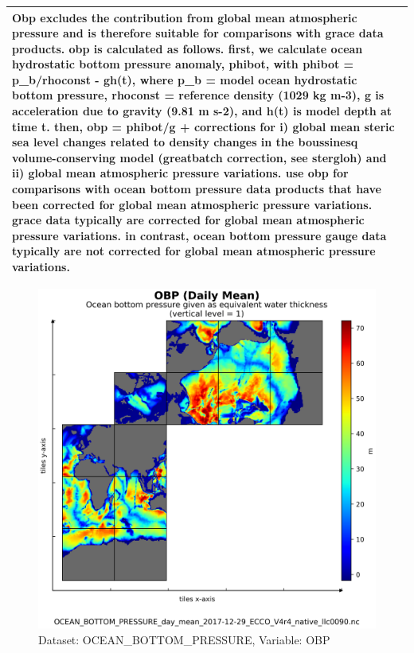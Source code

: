 \begin{longtable}{|m{}|m{}|m{}|m{}|}
\multicolumn{4}{|p{1\textwidth}|}{\footnotesize{{Obp excludes the contribution from global mean atmospheric pressure and is therefore suitable for comparisons with grace data products. obp is calculated as follows. first, we calculate ocean hydrostatic bottom pressure anomaly, phibot, with phibot = p\_b/rhoconst - gh(t), where p\_b = model ocean hydrostatic bottom pressure, rhoconst = reference density (1029 kg m-3), g is acceleration due to gravity (9.81 m s-2), and h(t) is model depth at time t. then, obp = phibot/g + corrections for i) global mean steric sea level changes related to density changes in the boussinesq volume-conserving model (greatbatch correction, see stergloh) and ii) global mean atmospheric pressure variations. use obp for comparisons with ocean bottom pressure data products that have been corrected for global mean atmospheric pressure variations. grace data typically are corrected for global mean atmospheric pressure variations. in contrast, ocean bottom pressure gauge data typically are not corrected for global mean atmospheric pressure variations.}}} \\ \hline
\end{longtable}

\begin{figure}[H]
\centering
\includegraphics[scale=0.55]{../images/plots/v4r4/native_plots/Ocean_Bottom_Pressure/OBP.png}
\caption{Dataset: OCEAN\_BOTTOM\_PRESSURE, Variable: OBP}
\label{tab:table-OCEAN_BOTTOM_PRESSURE_OBP-Plot}
\end{figure}
\newpage
\pagebreak
